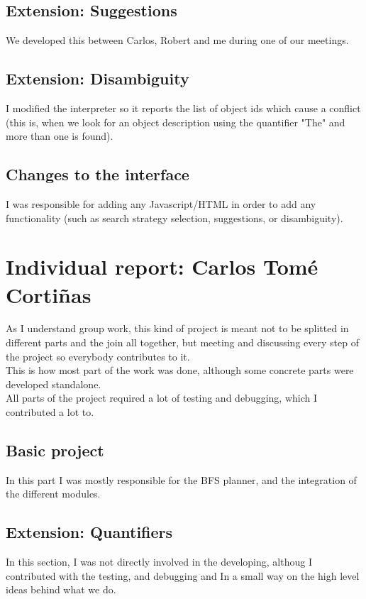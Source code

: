 \documentclass[11pt]{article}
\begin{document}
\subsection{Extension: Suggestions}

We developed this between Carlos, Robert and me during one of our meetings.

\subsection{Extension: Disambiguity}

I modified the interpreter so it reports the list of object ids which cause a conflict (this is, 
when we look for an object description using the quantifier "The" and more than one is found).

\subsection{Changes to the interface}

I was responsible for adding any Javascript/HTML in order to add any functionality (such as search strategy selection, suggestions, or disambiguity). 

\section{Individual report: Carlos Tom\'e Cortiñas}
As I understand group work, this kind of project is meant not to be splitted 
in different parts and the join all together, but meeting and discussing every step
of the project so everybody contributes to it.  \\

This is how most part of the work was done, although some concrete parts were 
developed standalone.  \\

All parts of the project required a lot of testing and debugging, which I 
contributed a lot to.  \\

\subsection{Basic project}
In this part I was mostly responsible for the BFS planner, and the integration 
of the different modules. \\

\subsection{Extension: Quantifiers}
In this section, I was not directly involved in the developing, althoug I 
contributed with the testing, and debugging and In a small way on the high 
level ideas behind what we do.  \\
\end{document}
